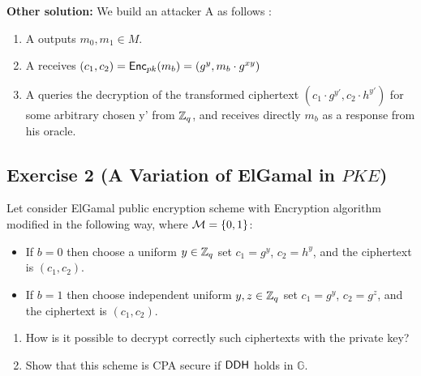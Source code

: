 \begin{solution}
\begin{enumerate}
		\textbf{Other solution:}
		We build an attacker A as follows :
		\begin{enumerate}
			\item A outputs $m_0, m_1 \in M$.
			\item A receives $(c_1,c_2)=\operatorname{\mathsf{Enc}}_{pk}(m_b)=(g^y,m_b \cdot g^{xy})$
			\item A queries the decryption of the transformed ciphertext $(c_1 \cdot g^{y'},c_2 \cdot h^{y'})$ for some arbitrary chosen y' from $\mathbb{Z}_q$, and receives directly $m_b$ as a response from his oracle.
		\end{enumerate}
	\end{enumerate}
\end{solution}



\subsection{Exercise 2 (A Variation of ElGamal in \texorpdfstring{$PKE$}{PKE})}

Let consider ElGamal public encryption scheme with Encryption algorithm modified in the following way, where $\mathcal{M}=\{0, 1\}$:
\begin{itemize}
	\item If $b=0$ then choose a uniform $y\in \mathbb{Z}_{q}$ set $c_1=g^y$, $c_2=h^y$, and the ciphertext is $(c_1,c_2)$.
	\item If $b=1$ then choose independent uniform $y,z \in \mathbb{Z}_{q}$ set $c_1=g^y$, $c_2=g^z$, and the ciphertext is $(c_1,c_2)$.
\end{itemize}

\begin{enumerate}
	\item How is it possible to decrypt correctly such ciphertexts with the private key?
	\item Show that this scheme is CPA secure if $\mathsf{DDH}$ holds in $\mathbb{G}$.
\end{enumerate}


